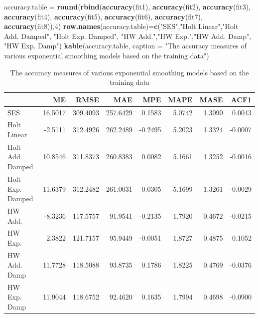 \documentclass[
]{book}
\newenvironment{Shaded}{\begin{snugshade}}{\end{snugshade}}
\newcommand{\AttributeTok}[1]{\textcolor[rgb]{0.13,0.29,0.53}{#1}}
\newcommand{\DecValTok}[1]{\textcolor[rgb]{0.00,0.00,0.81}{#1}}
\newcommand{\FunctionTok}[1]{\textcolor[rgb]{0.13,0.29,0.53}{\textbf{#1}}}
\newcommand{\NormalTok}[1]{#1}
\newcommand{\OtherTok}[1]{\textcolor[rgb]{0.56,0.35,0.01}{#1}}
\newcommand{\StringTok}[1]{\textcolor[rgb]{0.31,0.60,0.02}{#1}}
\begin{document}
\begin{Shaded}
\begin{Highlighting}[]
\NormalTok{accuracy.table }\OtherTok{=} \FunctionTok{round}\NormalTok{(}\FunctionTok{rbind}\NormalTok{(}\FunctionTok{accuracy}\NormalTok{(fit1), }\FunctionTok{accuracy}\NormalTok{(fit2), }\FunctionTok{accuracy}\NormalTok{(fit3), }\FunctionTok{accuracy}\NormalTok{(fit4),}
                             \FunctionTok{accuracy}\NormalTok{(fit5), }\FunctionTok{accuracy}\NormalTok{(fit6), }\FunctionTok{accuracy}\NormalTok{(fit7), }\FunctionTok{accuracy}\NormalTok{(fit8)),}\DecValTok{4}\NormalTok{)}
\FunctionTok{row.names}\NormalTok{(accuracy.table)}\OtherTok{=}\FunctionTok{c}\NormalTok{(}\StringTok{"SES"}\NormalTok{,}\StringTok{"Holt Linear"}\NormalTok{,}\StringTok{"Holt Add. Damped"}\NormalTok{, }\StringTok{"Holt Exp. Damped"}\NormalTok{,}
                            \StringTok{"HW Add."}\NormalTok{,}\StringTok{"HW Exp."}\NormalTok{,}\StringTok{"HW Add. Damp"}\NormalTok{, }\StringTok{"HW Exp. Damp"}\NormalTok{)}
\FunctionTok{kable}\NormalTok{(accuracy.table, }\AttributeTok{caption =} \StringTok{"The accuracy measures of various exponential smoothing models }
\StringTok{      based on the training data"}\NormalTok{)}
\end{Highlighting}
\end{Shaded}

\begin{table}

\caption{\label{tab:unnamed-chunk-249}The accuracy measures of various exponential smoothing models 
      based on the training data}
\centering
\begin{tabular}[t]{l|r|r|r|r|r|r|r}
\hline
  & ME & RMSE & MAE & MPE & MAPE & MASE & ACF1\\
\hline
SES & 16.5017 & 309.4093 & 257.6429 & 0.1583 & 5.0742 & 1.3090 & 0.0043\\
\hline
Holt Linear & -2.5111 & 312.4926 & 262.2489 & -0.2495 & 5.2023 & 1.3324 & -0.0007\\
\hline
Holt Add. Damped & 10.8546 & 311.8373 & 260.8383 & 0.0082 & 5.1661 & 1.3252 & -0.0016\\
\hline
Holt Exp. Damped & 11.6379 & 312.2482 & 261.0031 & 0.0305 & 5.1699 & 1.3261 & -0.0029\\
\hline
HW Add. & -8.3236 & 117.5757 & 91.9541 & -0.2135 & 1.7920 & 0.4672 & -0.0215\\
\hline
HW Exp. & 2.3822 & 121.7157 & 95.9449 & -0.0051 & 1.8727 & 0.4875 & 0.1052\\
\hline
HW Add. Damp & 11.7728 & 118.5088 & 93.8735 & 0.1786 & 1.8225 & 0.4769 & -0.0376\\
\hline
HW Exp. Damp & 11.9044 & 118.6752 & 92.4620 & 0.1635 & 1.7994 & 0.4698 & -0.0900\\
\hline
\end{tabular}
\end{table}
\end{document}
